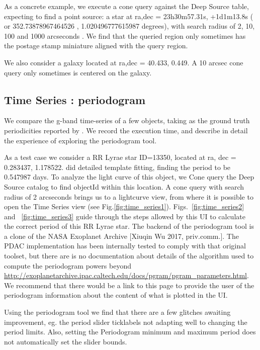 \documentclass[DM,lsstdraft,toc,usenatbib]{lsstdoc}
\begin{document}
As a concrete example, we execute a cone query against the Deep Source table,  expecting to find  a point source: a star at ra,dec = 23h30m57.31s, +1d1m13.8s  ( or 352.73878967464526 ,  1.020496777615987 degrees), with search radius of 2, 10, 100 and 1000 arcseconds . We find that the queried region only sometimes has the postage stamp miniature aligned with the query region. 

We also consider a galaxy located at ra,dec =  40.433,  0.449. A 10 arcsec cone query only sometimes is centered on the galaxy. 


\subsection{Time Series : periodogram}
\label{sec:periodogram}

We compare the g-band time-series of a few objects, taking as the ground truth periodicities reported by \cite{sesar2010}. We record the execution time, and describe in detail the experience of exploring the periodogram tool.   

As a test case we consider a RR Lyrae star ID=13350, located at  ra, dec = 0.283437\degree, 1.178522\degree. \cite{sesar2010} did detailed template fitting, finding the period to be 0.547987 days.
To analyze the light curve of this object, we Cone query the Deep Source catalog to find objectId within this location. 
 A cone query with search radius of 2 arcseconds brings us to a lightcurve view, from where it is possible to open the Time Series view (see Fig.\ref{fig:time_series1}). Figs.~\ref{fig:time_series2} and ~\ref{fig:time_series3} guide through the steps allowed by this UI to calculate the correct period of this RR Lyrae star.  The backend of the periodogram tool is a clone of the NASA Exoplanet Archive [Xiuqin Wu 2017, priv.comm.]. The PDAC implementation has been internally tested to comply with that original toolset, but there are is no documentation about details of the algorithm used to compute the periodogram powers beyond  \url{http://exoplanetarchive.ipac.caltech.edu/docs/pgram/pgram_parameters.html}. We recommend that there would be a link to this page to provide the user of the periodogram information about the content of what is plotted in the UI. 

Using the periodogram tool we find that there are a few glitches awaiting improvement, eg. the period slider ticklabels not adapting well to changing the period limits. Also, setting the Periodogram minimum and maximum period does not automatically set the slider bounds.  
\end{document}

